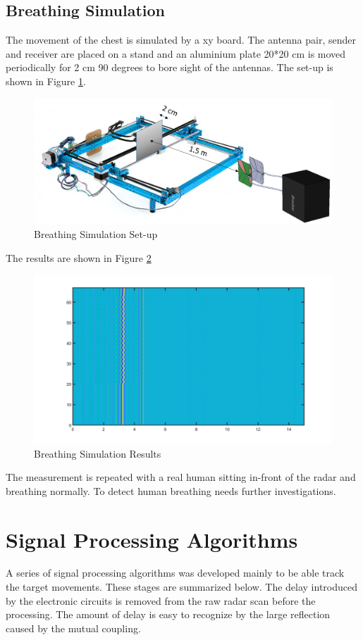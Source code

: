\subsection{Breathing Simulation}
The movement of the chest is simulated by a xy board. The antenna pair, sender and receiver are placed on a stand and an aluminium plate 20*20 cm is moved periodically for 2 cm 90 degrees to bore sight of the antennas. The set-up is shown in Figure \ref{fig:BreathingSimulation}.
\begin{figure}
    \centering
    \includegraphics[width=\linewidth]{Figures/BreathingSimulation.PNG}
    \caption{Breathing Simulation Set-up}
    \label{fig:BreathingSimulation}
\end{figure}
The results are shown in Figure \ref{fig:BreathingSimulationResults}
\begin{figure}
 \centering
  \includegraphics[width=\linewidth]{Figures/SimulationResult.jpg}
\caption{Breathing Simulation Results}
\label{fig:BreathingSimulationResults}
\end{figure}
The measurement is repeated with a real human sitting in-front of the radar and breathing normally. To detect human breathing needs further investigations.

\section{Signal Processing Algorithms}
A series of signal processing algorithms was developed mainly to be able track the target movements. These stages are summarized below.  The delay introduced by the electronic circuits is removed from the raw radar scan before the processing. The amount of delay is easy to recognize by the large reflection caused by the mutual coupling.
